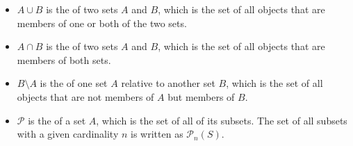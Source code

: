 \begin{itemize}
 \item $A \cup B$ is the  of two sets $A$ and $B$, 
 which is the set of all objects that are members of one or both of the two sets.

 \item $A \cap B$ is the  of two sets 
 $A$ and $B$, which is the set of all objects that are members of both sets.

 \item $B \setminus A$ is the  of one set
 $A$ relative to another set $B$, which is the set of all objects that are not 
 members of $A$ but members of $B$.

 \item $\mathcal{P}$ is the  of a set $A$, which is the set of 
 all of its subsets. The set of all subsets with a given cardinality $n$
 is written as $\mathcal{P}_{n}(S)$.
\end{itemize}

